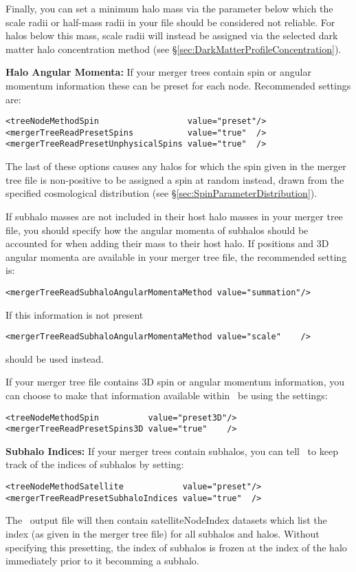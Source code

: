 Finally, you can set a minimum halo mass via the {\normalfont \ttfamily [mergerTreeReadPresetScaleRadiiMinimumMass]} parameter below which the scale radii or half-mass radii in your file should be considered not reliable. For halos below this mass, scale radii will instead be assigned via the selected dark matter halo concentration method (see \S\ref{sec:DarkMatterProfileConcentration}).

{\normalfont \bfseries Halo Angular Momenta:} If your merger trees contain spin or angular momentum information these can be preset for each node. Recommended settings are:
\begin{verbatim}
<treeNodeMethodSpin                  value="preset"/>
<mergerTreeReadPresetSpins           value="true"  />
<mergerTreeReadPresetUnphysicalSpins value="true"  />
\end{verbatim}
The last of these options causes any halos for which the spin given in the merger tree file is non-positive to be assigned a spin at random instead, drawn from the specified cosmological distribution (see \S\ref{sec:SpinParameterDistribution}).

If subhalo masses are not included in their host halo masses in your merger tree file, you should specify how the angular momenta of subhalos should be accounted for when adding their mass to their host halo. If positions and 3D angular momenta are available in your merger tree file, the recommended setting is:
\begin{verbatim}
<mergerTreeReadSubhaloAngularMomentaMethod value="summation"/>
\end{verbatim}
If this information is not present 
\begin{verbatim}
<mergerTreeReadSubhaloAngularMomentaMethod value="scale"    />
\end{verbatim}
should be used instead.

If your merger tree file contains 3D spin or angular momentum information, you can choose to make that information available within \glc\ be using the settings:
\begin{verbatim}
<treeNodeMethodSpin          value="preset3D"/>
<mergerTreeReadPresetSpins3D value="true"    />
\end{verbatim}

{\normalfont \bfseries Subhalo Indices:} If your merger trees contain subhalos, you can tell \glc\ to keep track of the indices of subhalos by setting:
\begin{verbatim}
<treeNodeMethodSatellite            value="preset"/>
<mergerTreeReadPresetSubhaloIndices value="true"  />
\end{verbatim}
The \glc\ output file will then contain {\normalfont \ttfamily satelliteNodeIndex} datasets which list the index (as given in the merger tree file) for all subhalos and halos. Without specifying this presetting, the index of subhalos is frozen at the index of the halo immediately prior to it becomming a subhalo.

